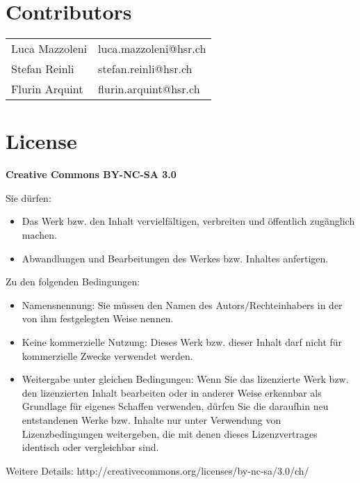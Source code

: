 \section*{Contributors}
\begin{tabular}{ll}
    Luca Mazzoleni& luca.mazzoleni@hsr.ch \\ 
    Stefan Reinli & stefan.reinli@hsr.ch \\ 
    Flurin Arquint & flurin.arquint@hsr.ch \\ 
\end{tabular} 

{\scriptsize 
    \section*{License}
    \textbf{Creative Commons BY-NC-SA 3.0}
    
    Sie dürfen:
    \begin{itemize}
        \item Das Werk bzw. den Inhalt vervielfältigen, verbreiten und öffentlich
        zugänglich machen.
        \item Abwandlungen und Bearbeitungen des Werkes bzw. Inhaltes anfertigen.
    \end{itemize}
    Zu den folgenden Bedingungen:
    \begin{itemize}
        \item Namensnennung: Sie müssen den Namen des Autors/Rechteinhabers in der von ihm
        festgelegten Weise nennen.
        \item Keine kommerzielle Nutzung: Dieses Werk bzw. dieser Inhalt darf nicht für
        kommerzielle Zwecke verwendet werden.
        \item  Weitergabe unter gleichen Bedingungen: Wenn Sie das lizenzierte Werk bzw. den
        lizenzierten Inhalt bearbeiten oder in anderer Weise erkennbar als Grundlage
        für eigenes Schaffen verwenden, dürfen Sie die daraufhin neu entstandenen
        Werke bzw. Inhalte nur unter Verwendung von Lizenzbedingungen weitergeben,
        die mit denen dieses Lizenzvertrages identisch oder vergleichbar sind.
    \end{itemize}
    Weitere Details: http://creativecommons.org/licenses/by-nc-sa/3.0/ch/
}
\clearpage
{}%